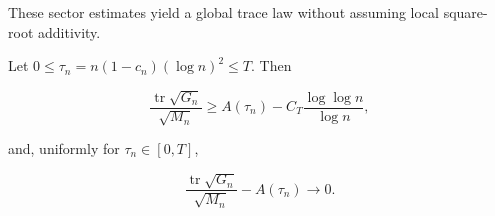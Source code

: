 These sector estimates yield a global trace law without assuming local
square-root additivity.

\begin{theorem}
\label{thm:supp-global-trace}
Let \(0\le\tau_n=n(1-c_n)(\log n)^2\le T\).  Then

\begin{equation}\label{eq:supp-global-trace-rate}
 \frac{\operatorname{tr}\sqrt{G_n}}{\sqrt{M_n}}
 \ge A(\tau_n)-C_T\frac{\log\log n}{\log n},
\end{equation}

and, uniformly for \(\tau_n\in[0,T]\),

\begin{equation}\label{eq:supp-global-trace-limit}
 \frac{\operatorname{tr}\sqrt{G_n}}{\sqrt{M_n}}
 -A(\tau_n)\longrightarrow0.
\end{equation}
\end{theorem}

